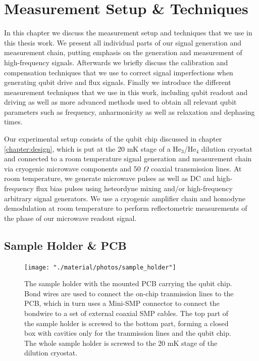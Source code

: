 \chapter{Measurement Setup \& Techniques} \label{chapter:measurement}

In this chapter we discuss the measurement setup and techniques that we use in this thesis work. We present all individual parts of our signal generation and measurement chain, putting emphasis on the generation and measurement of high-frequency signals. Afterwards we briefly discuss the calibration and compensation techniques that we use to correct signal imperfections when generating qubit drive and flux signals. Finally we introduce the different measurement techniques that we use in this work, including qubit readout and driving as well as more advanced methods used to obtain all relevant qubit parameters such as frequency, anharmonicity as well as relaxation and dephasing times.

\smallskip

Our experimental setup consists of the qubit chip discussed in chapter \ref{chapter:design}, which is put at the 20 mK stage of a He$_3$/He$_4$ dilution cryostat and connected to a room temperature signal generation and measurement chain via cryogenic microwave components and 50 $\Omega$ coaxial transmission lines. At room temperature, we generate microwave pulses as well as DC and high-frequency flux bias pulses using heteordyne mixing and/or high-frequency arbitrary signal generators. We use a cryogenic amplifier chain and homodyne demodulation at room temperature to perform reflectometric measurements of the phase of our microwave readout signal.

\section{Sample Holder \& PCB}

\begin{figure}
	\centering
		\texttt{[image: "./material/photos/sample\_holder"]}
	\caption[]{The sample holder with the mounted PCB carrying the qubit chip. Bond wires are used to connect the on-chip tranmission lines to the PCB, which in turn uses a Mini-SMP connector to connect the bondwire to a set of external coaxial SMP cables. The top part of the sample holder is screwed to the bottom part, forming a closed box with cavities only for the tranmission lines and the qubit chip. The whole sample holder is screwed to the 20 mK stage of the dilution cryostat.}
	\label{fig:pcb_and_sample_holder}
\end{figure}

